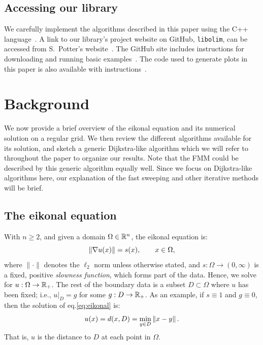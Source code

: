 \documentclass[smallcondensed]{svjour3}
\begin{document}
\subsection{Accessing our library} We carefully implement the
algorithms described in this paper using the C++
language~\cite{stroustrup2013c++}. A link to our library's project
website on GitHub, \texttt{libolim}, can be accessed from S.\ Potter's
website~\cite{sfp-umiacs-homepage}. The GitHub site includes
instructions for downloading and running basic
examples~\cite{libolim-github}. The code used to generate plots in
this paper is also available with
instructions~\cite{libolim-github-plotting}.

\section{Background}\label{sec:background}

We now provide a brief overview of the eikonal equation and its
numerical solution on a regular grid. We then review the different
algorithms available for its solution, and sketch a generic
Dijkstra-like algorithm which we will refer to throughout the paper to
organize our results. Note that the FMM could be described by this
generic algorithm equally well. Since we focus on Dijkstra-like
algorithms here, our explanation of the fast sweeping and other
iterative methods will be brief.

\subsection{The eikonal equation}

With $n \geq 2$, and given a domain $\Omega \in \mathbb{R}^n$, the eikonal
equation is:
\begin{equation}\label{eq:eikonal}
  \left\|\nabla u(x)\right\| = s(x), \qquad x \in \Omega,
\end{equation}
where $\|\cdot\|$ denotes the $\ell_2$ norm unless otherwise stated,
and $s : \Omega \to (0, \infty)$ is a fixed, positive \emph{slowness
  function}, which forms part of the data. Hence, we solve for
$u : \Omega \to \mathbb{R}_+$. The rest of the boundary data is a subset
$D \subset \Omega$ where $u$ has been fixed; i.e.,
$\left. u \right|_D = g$ for some $g : D \to \mathbb{R}_+$. As an example, if
$s \equiv 1$ and $g \equiv 0$, then the solution of eq.\@ \ref{eq:eikonal} is:
\begin{equation}
  \label{eq:distance-to-Omega}
  u(x) = d(x, D) = \min_{y \in D} \left\|x - y\right\|.
\end{equation}
That is, $u$ is the distance to $D$ at each point in
$\Omega$.
\end{document}
